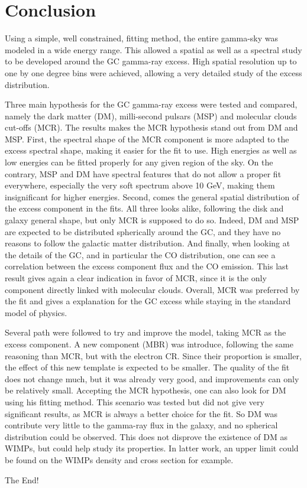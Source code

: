 \chapter{Conclusion}
\label{ch:conclusion}

%
%
%
%
%

Using a simple, well constrained, fitting method, the entire gamma-sky was modeled in a wide energy range. This allowed a spatial as well as a spectral study to be developed around the GC gamma-ray excess. High spatial resolution up to one by one degree bins were achieved, allowing a very detailed study of the excess distribution.

Three main hypothesis for the GC gamma-ray excess were tested and compared, namely the dark matter (DM), milli-second pulsars (MSP) and molecular clouds cut-offs (MCR). The results makes the MCR hypothesis stand out from DM and MSP. First, the spectral shape of the MCR component is more adapted to the excess spectral shape, making it easier for the fit to use. High energies as well as low energies can be fitted properly for any given region of the sky. On the contrary, MSP and DM have spectral features that do not allow a proper fit everywhere, especially the very soft spectrum above 10 GeV, making them insignificant for higher energies. Second, comes the general spatial distribution of the excess component in the fits. All three looks alike, following the disk and galaxy general shape, but only MCR is supposed to do so. Indeed, DM and MSP are expected to be distributed spherically around the GC, and they have no reasons to follow the galactic matter distribution. And finally, when looking at the details of the GC, and in particular the CO distribution, one can see a correlation between the excess component flux and the CO emission. This last result gives again a clear indication in favor of MCR, since it is the only component directly linked with molecular clouds. Overall, MCR was preferred by the fit and gives a explanation for the GC excess while staying in the standard model of physics.

Several path were followed to try and improve the model, taking MCR as the excess component. A new component (MBR) was introduce, following the same reasoning than MCR, but with the electron CR. Since their proportion is smaller, the effect of this new template is expected to be smaller. The quality of the fit does not change much, but it was already very good, and improvements can only be relatively small.
Accepting the MCR hypothesis, one can also look for DM using his fitting method. This scenario was tested but did not give very significant results, as MCR is always a better choice for the fit. So DM was contribute very little to the gamma-ray flux in the galaxy, and no spherical distribution could be observed. This does not disprove the existence of DM as WIMPs, but could help study its properties. In latter work, an upper limit could be found on the WIMPs density and cross section for example.


The End!

